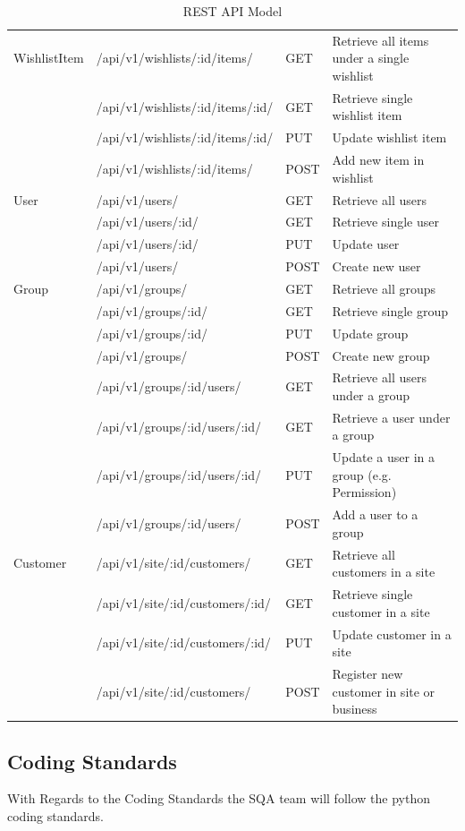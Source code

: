 \documentclass{report}
\begin{document}
\begin{table}[ht]
{\begin{tabular}{llll}
WishlistItem			& /api/v1/wishlists/:id/items/ & GET & Retrieve all items under a single wishlist \\ 
							& /api/v1/wishlists/:id/items/:id/ & GET & Retrieve single wishlist item \\ 
							& /api/v1/wishlists/:id/items/:id/ & PUT & Update wishlist item \\
							& /api/v1/wishlists/:id/items/ & POST & Add new item in wishlist  \\ \hline
User 					& /api/v1/users/ & GET & Retrieve all users \\ 
							& /api/v1/users/:id/ & GET & Retrieve single user \\
							& /api/v1/users/:id/ & PUT & Update user \\ 
							& /api/v1/users/ & POST & Create new user \\  \hline							
Group 					& /api/v1/groups/ & GET & Retrieve all groups \\ 
							& /api/v1/groups/:id/ & GET & Retrieve single group \\
							& /api/v1/groups/:id/ & PUT & Update group \\ 
							& /api/v1/groups/ & POST & Create new group \\  \hline		
							& /api/v1/groups/:id/users/ & GET & Retrieve all users under a group \\ 
							& /api/v1/groups/:id/users/:id/ & GET & Retrieve a user under a group \\
							& /api/v1/groups/:id/users/:id/ & PUT & Update a user in a group (e.g. Permission) \\
							& /api/v1/groups/:id/users/ & POST & Add a user to a group \\ \hline											
Customer 			& /api/v1/site/:id/customers/ & GET & Retrieve all customers in a site \\ 
							& /api/v1/site/:id/customers/:id/ & GET & Retrieve single customer in a site \\
							& /api/v1/site/:id/customers/:id/ & PUT & Update customer in a site \\ 
							& /api/v1/site/:id/customers/ & POST & Register new customer in site or business \\ 				
\end{tabular}
}
\caption{REST API Model}
\label{API Model}
\end{table}

\subsection{Coding Standards}
With Regards to the Coding Standards the SQA team will follow the python coding standards.
\end{document}
